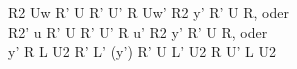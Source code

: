 R2 Uw R' U R' U' R Uw' R2 y' R' U R, oder\\
R2' u R' U R' U' R u' R2 y' R' U R, oder\\
y' R L U2 R' L' (y') R' U L' U2 R U' L U2\\
